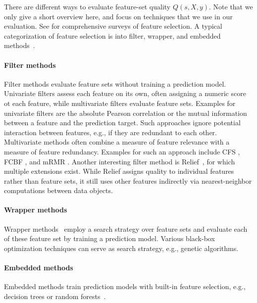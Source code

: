 \documentclass{article}
\theoremstyle{definition}
\begin{document}
There are different ways to evaluate feature-set quality $Q(s,X,y)$.
Note that we only give a short overview here, and focus on techniques that we use in our evaluation.
See \cite{chandrashekar2014survey,li2017feature} for comprehensive surveys of feature selection.
A typical categorization of feature selection is into filter, wrapper, and embedded methods~\cite{guyon2003introduction}.

\paragraph{Filter methods}

Filter methods evaluate feature sets without training a prediction model.
Univariate filters assess each feature on its own, often assigning a numeric score ot each feature, while multivariate filters evaluate feature sets.
Examples for univariate filters are the absolute Pearson correlation or the mutual information between a feature and the prediction target.
Such approaches ignore potential interaction between features, e.g., if they are redundant to each other.
Multivariate methods often combine a measure of feature relevance with a measure of feature redundancy.
Examples for such an approach include CFS \cite{hall1999correlation}, FCBF \cite{yu2003feature}, and mRMR \cite{peng2005feature}.
Another interesting filter method is Relief~\cite{kira1992feature}, for which multiple extensions exist.
While Relief assigns quality to individual features rather than feature sets, it still uses other features indirectly via nearest-neighbor computations between data objects.

\paragraph{Wrapper methods}

Wrapper methods~\cite{kohavi1997wrappers} employ a search strategy over feature sets and evaluate each of these feature set by training a prediction model.
Various black-box optimization techniques can serve as search strategy, e.g., genetic algorithms.

\paragraph{Embedded methods}

Embedded methods train prediction models with built-in feature selection, e.g., decision trees or random forests~\cite{breiman2001random}.
\end{document}
